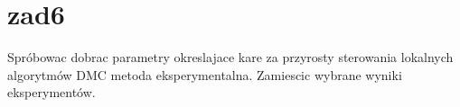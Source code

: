 \section{zad6}
\label{lab:zad6}

Spróbowac dobrac parametry okreslajace kare za przyrosty sterowania lokalnych algorytmów
DMC metoda eksperymentalna. Zamiescic wybrane wyniki eksperymentów.

%    



\newpage
